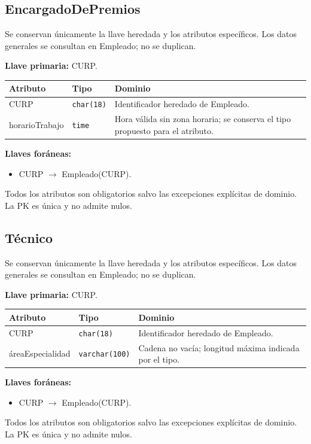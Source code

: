 \par\noindent\begin{minipage}{\textwidth}
\subsection{EncargadoDePremios}
Se conservan únicamente la llave heredada y los atributos específicos. Los datos generales se consultan en Empleado; no se duplican.\par
\textbf{Llave primaria:} CURP.\par
{\small\begin{tabular}{@{}p{}p{}p{}@{}}
\toprule Atributo & Tipo & Dominio \\ \midrule
CURP & \texttt{char(18)} & Identificador heredado de Empleado. \\
horarioTrabajo & \texttt{time} & Hora válida sin zona horaria; se conserva el tipo propuesto para el atributo. \\
\bottomrule\end{tabular}}
\textbf{Llaves foráneas:}\begin{itemize}[nosep]
\item CURP $\rightarrow$ Empleado(CURP).
\end{itemize}
Todos los atributos son obligatorios salvo las excepciones explícitas de dominio. La PK es única y no admite nulos.
\end{minipage}\par\vspace{.35cm}
\par\noindent\begin{minipage}{\textwidth}
\subsection{Técnico}
Se conservan únicamente la llave heredada y los atributos específicos. Los datos generales se consultan en Empleado; no se duplican.\par
\textbf{Llave primaria:} CURP.\par
{\small\begin{tabular}{@{}p{}p{}p{}@{}}
\toprule Atributo & Tipo & Dominio \\ \midrule
CURP & \texttt{char(18)} & Identificador heredado de Empleado. \\
áreaEspecialidad & \texttt{varchar(100)} & Cadena no vacía; longitud máxima indicada por el tipo. \\
\bottomrule\end{tabular}}
\textbf{Llaves foráneas:}\begin{itemize}[nosep]
\item CURP $\rightarrow$ Empleado(CURP).
\end{itemize}
Todos los atributos son obligatorios salvo las excepciones explícitas de dominio. La PK es única y no admite nulos.
\end{minipage}\par\vspace{.35cm}
